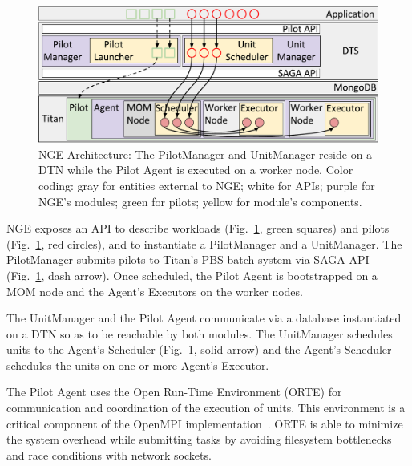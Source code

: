\begin{figure}
  \centering
	\includegraphics[width=\columnwidth]{figures/rp_architecture_compact_atlaswms_paper.pdf}
	\vspace{-0.3in}
	\caption{NGE Architecture: The PilotManager and UnitManager reside on a
  	DTN while the Pilot Agent is executed on a worker node. Color coding:
  	gray for entities external to NGE\@; white for APIs; purple for NGE's
  	modules; green for pilots; yellow for module's components.}
\label{fig:arch-overview}
\end{figure}

NGE exposes an API to describe workloads (Fig.~\ref{fig:arch-overview}, green
squares) and pilots (Fig.~\ref{fig:arch-overview}, red circles), and to
instantiate a PilotManager and a UnitManager. The PilotManager submits pilots
to Titan's PBS batch system via SAGA API (Fig.~\ref{fig:arch-overview}, dash
arrow). Once scheduled, the Pilot Agent is bootstrapped on a MOM node and the
Agent's Executors on the worker nodes.

The UnitManager and the Pilot Agent communicate via a database instantiated
on a DTN so as to be reachable by both modules. The UnitManager schedules
units to the Agent's Scheduler (Fig.~\ref{fig:arch-overview}, solid arrow)
and the Agent's Scheduler schedules the units on one or more Agent's
Executor.

The Pilot Agent uses the Open Run-Time Environment (ORTE) for communication
and coordination of the execution of units. This environment is a critical
component of the OpenMPI implementation~\cite{castain05:_open_rte}. ORTE is
able to minimize the system overhead while submitting tasks by avoiding
filesystem bottlenecks and race conditions with network sockets.